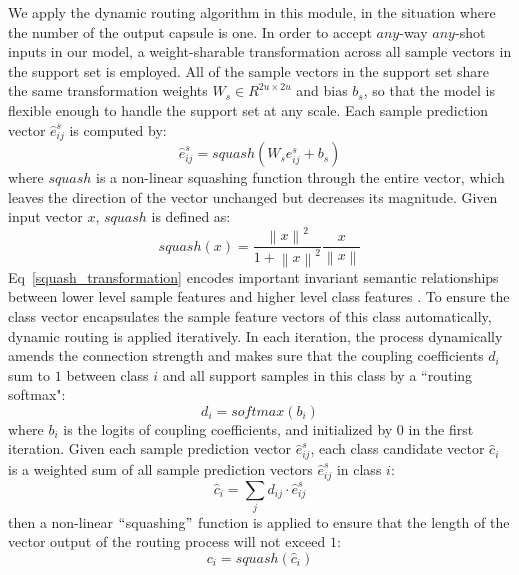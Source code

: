 \documentclass[11pt,a4paper]{article}
\begin{document}
We apply the dynamic routing algorithm \citep{sabour2017dynamic} in this module, in the situation where the number of the output capsule is one. 
In order to accept $any$-way $any$-shot inputs in our model, a weight-sharable transformation across all sample vectors in the support set is employed. All of the sample vectors in the support set share the same
transformation weights ${W_s} \in {R^{2u \times 2u}}$ and bias $b_s$, so that the model is flexible enough to handle the support set at any scale. Each sample prediction vector $\hat{e}_{ij}^s$ is computed by:
\begin{equation}
{\hat{e}_{ij}^s} = squash({W_s}{{e}_{ij}^s} + b_s)
\label{squash_transformation}
\end{equation}
where $squash$ is a non-linear squashing function through the entire vector, which leaves the direction of the vector unchanged but decreases its magnitude. Given input vector $x$, $squash$ is defined as:
\begin{equation}
squash(x) = \frac{{{{\left\| {x} \right\|}^2}}}{{1 + {{\left\| {x} \right\|}^2}}}\frac{{x}}{{\left\| {x} \right\|}}
\end{equation}
Eq~\ref{squash_transformation} encodes important invariant semantic relationships between lower level sample features and higher level class features \citep{hinton2011transforming}.
To ensure the class vector encapsulates the sample feature vectors of this class automatically, dynamic routing is applied iteratively. In each iteration, the process dynamically amends the connection strength and makes sure that the coupling coefficients $d_i$ sum to $1$ between class $i$ and all support samples in this class by a ``routing softmax":
\begin{equation}
{d_{i}} = softmax \left( {b_{i}} \right)
\end{equation}
where $b_i$ is the logits of coupling coefficients, and initialized by $0$ in the first iteration. 
Given each sample prediction vector ${\hat{e}_{ij}^s}$, each class candidate vector ${\hat{c}_i}$ is a weighted sum of all sample prediction vectors ${\hat{e}_{ij}^s}$ in class $i$:
\begin{equation}
{\hat{c}_i} =  {\sum\limits_j {{d_{ij} \cdot {\hat{e}_{ij}^s}} }} 
\end{equation}
then a non-linear $``$squashing$"$ function is applied to ensure that the length of the vector output of the routing process will not exceed $1$:
\begin{equation}
{c_i} = squash({\hat{c}_i})
\label{squash}
\end{equation}
\end{document}
